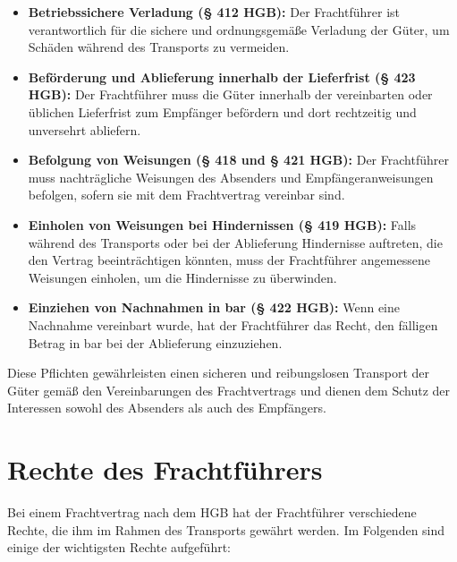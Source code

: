 \begin{itemize}
    \item \textbf{Betriebssichere Verladung (§ 412 HGB):} Der Frachtführer ist verantwortlich für die sichere und ordnungsgemäße Verladung der Güter, um Schäden während des Transports zu vermeiden.
    \item \textbf{Beförderung und Ablieferung innerhalb der Lieferfrist (§ 423 HGB):} Der Frachtführer muss die Güter innerhalb der vereinbarten oder üblichen Lieferfrist zum Empfänger befördern und dort rechtzeitig und unversehrt abliefern.
    \item \textbf{Befolgung von Weisungen (§ 418 und § 421 HGB):} Der Frachtführer muss nachträgliche Weisungen des Absenders und Empfängeranweisungen befolgen, sofern sie mit dem Frachtvertrag vereinbar sind.
    \item \textbf{Einholen von Weisungen bei Hindernissen (§ 419 HGB):} Falls während des Transports oder bei der Ablieferung Hindernisse auftreten, die den Vertrag beeinträchtigen könnten, muss der Frachtführer angemessene Weisungen einholen, um die Hindernisse zu überwinden.
    \item \textbf{Einziehen von Nachnahmen in bar (§ 422 HGB):} Wenn eine Nachnahme vereinbart wurde, hat der Frachtführer das Recht, den fälligen Betrag in bar bei der Ablieferung einzuziehen.
\end{itemize}

Diese Pflichten gewährleisten einen sicheren und reibungslosen Transport der Güter gemäß den Vereinbarungen des Frachtvertrags und dienen dem Schutz der Interessen sowohl des Absenders als auch des Empfängers.

\section{Rechte des Frachtführers}

Bei einem Frachtvertrag nach dem HGB hat der Frachtführer verschiedene Rechte, die ihm im Rahmen des Transports gewährt werden. Im Folgenden sind einige der wichtigsten Rechte aufgeführt:

